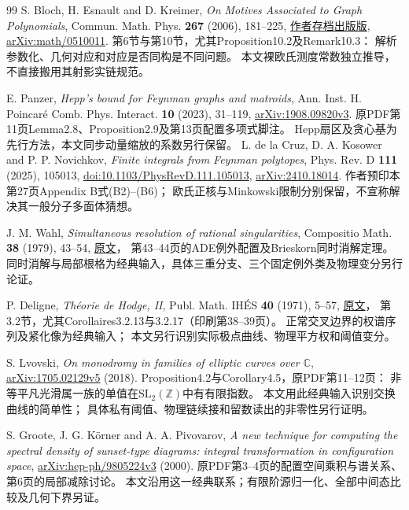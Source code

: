 \documentclass[11pt,a4paper]{ctexart}
\theoremstyle{cnplain}\newtheorem{theorem}{定理}[section]
\theoremstyle{definition}\newtheorem{definition}[theorem]{定义}
\theoremstyle{remark}\newtheorem{remark}[theorem]{注}
\begin{document}
\begin{thebibliography}{99}
 S. Bloch, H. Esnault and D. Kreimer,
\emph{On Motives Associated to Graph Polynomials},
Commun. Math. Phys. \textbf{267} (2006), 181--225,
\href{https://page.mi.fu-berlin.de/esnault/preprints/helene/79-motives.pdf}{作者存档出版版},
\href{https://arxiv.org/abs/math/0510011}{arXiv:math/0510011}.
第6节与第10节，尤其Proposition10.2及Remark10.3：
解析参数化、几何对应和对应是否同构是不同问题。
本文裸欧氏测度常数独立推导，不直接搬用其射影实链规范。

 E. Panzer,
\emph{Hepp's bound for Feynman graphs and matroids},
Ann. Inst. H. Poincar\'e Comb. Phys. Interact. \textbf{10} (2023), 31--119,
\href{https://arxiv.org/abs/1908.09820}{arXiv:1908.09820v3}.
原PDF第11页Lemma2.8、Proposition2.9及第13页配置多项式脚注。
Hepp扇区及贪心基为先行方法，本文同步动量缩放的系数另行保留。
 L. de la Cruz, D. A. Kosower and P. P. Novichkov,
\emph{Finite integrals from Feynman polytopes},
Phys. Rev. D \textbf{111} (2025), 105013,
\href{https://doi.org/10.1103/PhysRevD.111.105013}{doi:10.1103/PhysRevD.111.105013},
\href{https://arxiv.org/abs/2410.18014}{arXiv:2410.18014}.
作者预印本第27页Appendix B式(B2)--(B6)；
欧氏正核与Minkowski限制分别保留，不宣称解决其一般分子多面体猜想。

 J. M. Wahl, \emph{Simultaneous resolution of rational singularities},
Compositio Math. \textbf{38} (1979), 43--54,
\href{https://www.numdam.org/item/CM_1979__38_1_43_0.pdf}{原文}，
第43--44页的ADE例外配置及Brieskorn同时消解定理。
同时消解与局部根格为经典输入，具体三重分支、三个固定例外类及物理变分另行论证。

 P. Deligne, \emph{Théorie de Hodge, II},
Publ. Math. IHÉS \textbf{40} (1971), 5--57,
\href{https://www.numdam.org/item/PMIHES_1971__40__5_0.pdf}{原文}，
第3.2节，尤其Corollaires3.2.13与3.2.17（印刷第38--39页）。
正常交叉边界的权谱序列及紧化像为经典输入；
本文另行识别实际极点曲线、物理平方权和阈值变分。

 S. Lvovski,
\emph{On monodromy in families of elliptic curves over $\mathbb C$},
\href{https://arxiv.org/abs/1705.02129}{arXiv:1705.02129v5} (2018).
Proposition4.2与Corollary4.5，原PDF第11--12页：
非等平凡光滑属一族的单值在$\mathrm{SL}_2(\mathbb Z)$中有有限指数。
本文用此经典输入识别交换曲线的简单性；
具体私有阈值、物理链续接和留数读出的非零性另行证明。

 S. Groote, J. G. K\"orner and A. A. Pivovarov,
\emph{A new technique for computing the spectral density of sunset-type diagrams:
integral transformation in configuration space},
\href{https://arxiv.org/abs/hep-ph/9805224}{arXiv:hep-ph/9805224v3} (2000).
原PDF第3--4页的配置空间乘积与谱关系、第6页的局部减除讨论。
本文沿用这一经典联系；有限阶源归一化、全部中间态比较及几何下界另证。


\end{thebibliography}
\end{document}
